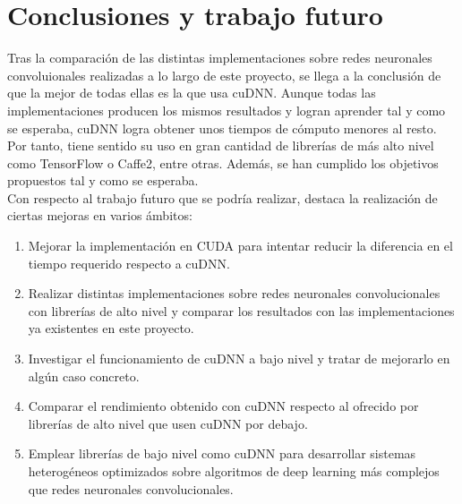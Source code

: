 \chapter{Conclusiones y trabajo futuro}

Tras la comparación de las distintas implementaciones sobre redes neuronales convoluionales realizadas a lo largo de este proyecto, se llega a la conclusión de que la mejor de todas ellas es la que usa cuDNN. Aunque todas las implementaciones producen los mismos resultados y logran aprender tal y como se esperaba, cuDNN logra obtener unos tiempos de cómputo menores al resto. Por tanto, tiene sentido su uso en gran cantidad de librerías de más alto nivel como TensorFlow o Caffe2, entre otras. Además, se han cumplido los objetivos propuestos tal y como se esperaba. \\
Con respecto al trabajo futuro que se podría realizar, destaca la realización de ciertas mejoras en varios ámbitos:
\begin{enumerate}[label=\textbullet]
	\item Mejorar la implementación en CUDA para intentar reducir la diferencia en el tiempo requerido respecto a cuDNN.
	\item Realizar distintas implementaciones sobre redes neuronales convolucionales con librerías de alto nivel y comparar los resultados con las implementaciones ya existentes en este proyecto.
	\item Investigar el funcionamiento de cuDNN a bajo nivel y tratar de mejorarlo en algún caso concreto.
	\item Comparar el rendimiento obtenido con cuDNN respecto al ofrecido por librerías de alto nivel que usen cuDNN por debajo.
	\item Emplear librerías de bajo nivel como cuDNN para desarrollar sistemas heterogéneos optimizados sobre algoritmos de deep learning más complejos que redes neuronales convolucionales.  
\end{enumerate}